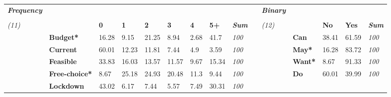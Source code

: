 {\setlength{\tabcolsep}{2pt}
\begin{center}
\scriptsize
\begin{longtable}{lllllllllllllll}
\toprule
\textit{\textbf{Frequency}} &
   &
   &
   &
   &
   &
   &
   &
  \textit{} &
   &
  \textit{\textbf{Binary}} &
   &
   &
   &
  \textit{} \\
 &
   &
   &
   &
   &
   &
   &
   &
  \textit{} &
   &
   &
   &
   &
   &
  \textit{} \\
\textit{(11)} &
   &
  \textbf{0} &
  \textbf{1} &
  \textbf{2} &
  \textbf{3} &
  \textbf{4} &
  \textbf{5+} &
  \textit{\textbf{Sum}} &
  \textbf{} &
  \textit{(12)} &
   &
  \textbf{No} &
  \textbf{Yes} &
  \textit{\textbf{Sum}} \\
 &
  \textbf{Budget*} &
  \cellcolor[HTML]{EEEEEE}16.28 &
  \cellcolor[HTML]{F6F6F6}9.15 &
  \cellcolor[HTML]{E7E7E7}21.25 &
  \cellcolor[HTML]{F7F7F7}8.94 &
  \cellcolor[HTML]{FEFEFE}2.68 &
  \cellcolor[HTML]{CECECE}41.7 &
  \textit{100} &
   &
   &
  \textbf{Can} &
  \cellcolor[HTML]{DFDFDF}38.41 &
  \cellcolor[HTML]{C7C7C7}61.59 &
  \textit{100} \\
 &
  \textbf{Current} &
  \cellcolor[HTML]{B8B8B8}60.01 &
  \cellcolor[HTML]{F2F2F2}12.23 &
  \cellcolor[HTML]{F3F3F3}11.81 &
  \cellcolor[HTML]{F8F8F8}7.44 &
  \cellcolor[HTML]{FBFBFB}4.9 &
  \cellcolor[HTML]{FDFDFD}3.59 &
  \textit{100} &
   &
   &
  \textbf{May*} &
  \cellcolor[HTML]{F7F7F7}16.28 &
  \cellcolor[HTML]{AFAFAF}83.72 &
  \textit{100} \\
 &
  \textbf{Feasible} &
  \cellcolor[HTML]{D8D8D8}33.83 &
  \cellcolor[HTML]{EEEEEE}16.03 &
  \cellcolor[HTML]{F1F1F1}13.57 &
  \cellcolor[HTML]{F3F3F3}11.57 &
  \cellcolor[HTML]{F6F6F6}9.67 &
  \cellcolor[HTML]{EFEFEF}15.34 &
  \textit{100} &
   &
   &
  \textbf{Want*} &
  \cellcolor[HTML]{FFFFFF}8.67 &
  \cellcolor[HTML]{A6A6A6}91.33 &
  \textit{100} \\
 &
  \textbf{Free-choice*} &
  \cellcolor[HTML]{F7F7F7}8.67 &
  \cellcolor[HTML]{E3E3E3}25.18 &
  \cellcolor[HTML]{E3E3E3}24.93 &
  \cellcolor[HTML]{E8E8E8}20.48 &
  \cellcolor[HTML]{F4F4F4}11.3 &
  \cellcolor[HTML]{F6F6F6}9.44 &
  \textit{100} &
   &
   &
  \textbf{Do} &
  \cellcolor[HTML]{C8C8C8}60.01 &
  \cellcolor[HTML]{DEDEDE}39.99 &
  \textit{100} \\
 &
  \textbf{Lockdown} &
  \cellcolor[HTML]{CDCDCD}43.02 &
  \cellcolor[HTML]{FAFAFA}6.17 &
  \cellcolor[HTML]{F8F8F8}7.44 &
  \cellcolor[HTML]{FBFBFB}5.57 &
  \cellcolor[HTML]{F8F8F8}7.49 &
  \cellcolor[HTML]{DCDCDC}30.31 &
  \textit{100} &
   &

\end{longtable}
\end{center}}
